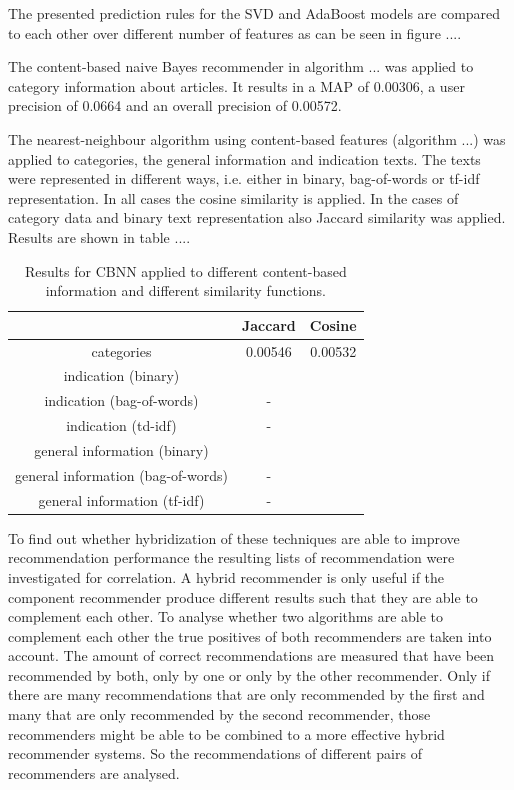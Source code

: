 \documentclass[10pt]{reportMaster}
\begin{document}
The presented prediction rules for the SVD and AdaBoost models are compared to each other over different number of features as can be seen in figure .... %

The content-based naive Bayes recommender in algorithm ... was applied to category information about articles. %
It results in a MAP of 0.00306, a user precision of 0.0664 and an overall precision of 0.00572.

The nearest-neighbour algorithm using content-based features (algorithm ...) was applied to categories, the general information and indication texts.%
The texts were represented in different ways, i.e. either in binary, bag-of-words or tf-idf representation.
In all cases the cosine similarity is applied.
In the cases of category data and binary text representation also Jaccard similarity was applied. 
Results are shown in table .... %

\begin{table}
	\caption{Results for CBNN applied to different content-based information and different similarity functions.}
\label{tab:CBNN}
\begin{tabular}{|c|c|c|}
	\hline
&Jaccard&Cosine\\ \hline
categories&0.00546&0.00532\\ \hline
indication (binary)&&\\ \hline	
indication (bag-of-words)&-&\\ \hline	
indication (td-idf)&-&\\ \hline	
general information (binary)&&\\ \hline	
general information (bag-of-words)&-&\\ \hline	
general information (tf-idf)&-&\\ \hline	
\end{tabular}
\end{table}

To find out whether hybridization of these techniques are able to improve recommendation performance the resulting lists of recommendation were investigated for correlation.
A hybrid recommender is only useful if the component recommender produce different results such that they are able to complement each other.
To analyse whether two algorithms are able to complement each other the true positives of both recommenders are taken into account.
The amount of correct recommendations are measured that have been recommended by both, only by one or only by the other recommender.
Only if there are many recommendations that are only recommended by the first and many that are only recommended by the second recommender, those recommenders might be able to be combined to a more effective hybrid recommender systems.
So the recommendations of different pairs of recommenders are analysed. %
\end{document}

